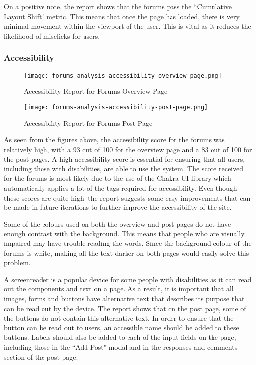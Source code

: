 On a positive note, the report shows that the forums pass the ``Cumulative Layout Shift" metric.
This means that once the page has loaded, there is very minimal movement within the viewport of the user.
This is vital as it reduces the likelihood of misclicks for users.

\subsubsection{Accessibility}

\begin{figure}[h!]
    \texttt{[image: forums-analysis-accessibility-overview-page.png]}
    \centering
    \caption{Accessibility Report for Forums Overview Page}
\end{figure}

\begin{figure}[h!]
    \texttt{[image: forums-analysis-accessibility-post-page.png]}
    \centering
    \caption{Accessibility Report for Forums Post Page}
\end{figure}

As seen from the figures above, the accessibility score for the forums was relatively high, with a 93 out of 100 for the overview page and a 83 out of 100 for the post pages.
A high accessibility score is essential for ensuring that all users, including those with disabilities, are able to use the system.
The score received for the forums is most likely due to the use of the Chakra-UI library which automatically applies a lot of the tags required for accessibility.
Even though these scores are quite high, the report suggests some easy improvements that can be made in future iterations to further improve the accessibility of the site.

Some of the colours used on both the overview and post pages do not have enough contrast with the background.
This means that people who are visually impaired may have trouble reading the words.
Since the background colour of the forums is white, making all the text darker on both pages would easily solve this problem.

A screenreader is a popular device for some people with disabilities as it can read out the components and text on a page.
As a result, it is important that all images, forms and buttons have alternative text that describes its purpose that can be read out by the device.
The report shows that on the post page, some of the buttons do not contain this alternative text.
In order to ensure that the button can be read out to users, an accessible name should be added to these buttons.
Labels should also be added to each of the input fields on the page, including those in the ``Add Post" modal and in the responses and comments section of the post page.

